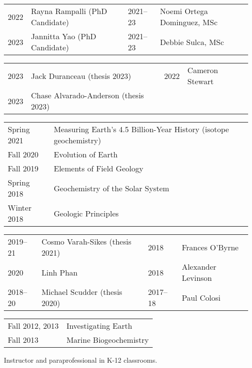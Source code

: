 \begin{tabular}{ll|ll}
	2022\ongoing & Rayna Rampalli (PhD Candidate) 
	&
	2021--23 & Noemi Ortega Dominguez, MSc
	\\
	2023\ongoing & Jannitta Yao (PhD Candidate)
	&
	2021--23 & Debbie Sulca, MSc
\end{tabular}
\begin{tabular}{ll | ll}
	2023 & Jack Duranceau (thesis 2023) & 2022 & Cameron Stewart\\
	2023 & Chase Alvarado-Anderson (thesis 2023)\\
\end{tabular}

\begin{tabular}{ll}
	Spring 2021 & Measuring Earth’s 4.5 Billion-Year History \normalfont(isotope geochemistry)\\
	Fall 2020 & Evolution of Earth\\
	Fall 2019 & Elements of Field Geology\\
	Spring 2018 & Geochemistry of the Solar System\\
	Winter 2018 & Geologic Principles
\end{tabular}

\begin{tabular}{ll | ll}
	2019--21 & Cosmo Varah-Sikes (thesis 2021) &
	2018 & Frances O'Byrne\\
	2020 & Linh Phan &
	2018 & Alexander Levinson \\
	2018--20 & Michael Scudder (thesis 2020) &
	2017--18 & Paul Colosi
\end{tabular}

\begin{tabular}{l l} %
Fall 2012, 2013 & Investigating Earth\\Fall 2013 & Marine Biogeochemistry
\end{tabular}

Instructor and paraprofessional in K-12 classrooms.